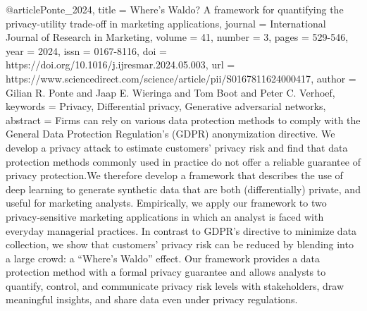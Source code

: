 @article{Ponte_2024,
title = {Where’s Waldo? A framework for quantifying the privacy-utility trade-off in marketing applications},
journal = {International Journal of Research in Marketing},
volume = {41},
number = {3},
pages = {529-546},
year = {2024},
issn = {0167-8116},
doi = {https://doi.org/10.1016/j.ijresmar.2024.05.003},
url = {https://www.sciencedirect.com/science/article/pii/S0167811624000417},
author = {Gilian R. Ponte and Jaap E. Wieringa and Tom Boot and Peter C. Verhoef},
keywords = {Privacy, Differential privacy, Generative adversarial networks},
abstract = {Firms can rely on various data protection methods to comply with the General Data Protection Regulation’s (GDPR) anonymization directive. We develop a privacy attack to estimate customers’ privacy risk and find that data protection methods commonly used in practice do not offer a reliable guarantee of privacy protection.We therefore develop a framework that describes the use of deep learning to generate synthetic data that are both (differentially) private, and useful for marketing analysts. Empirically, we apply our framework to two privacy-sensitive marketing applications in which an analyst is faced with everyday managerial practices. In contrast to GDPR’s directive to minimize data collection, we show that customers’ privacy risk can be reduced by blending into a large crowd: a “Where’s Waldo” effect. Our framework provides a data protection method with a formal privacy guarantee and allows analysts to quantify, control, and communicate privacy risk levels with stakeholders, draw meaningful insights, and share data even under privacy regulations.}
}
